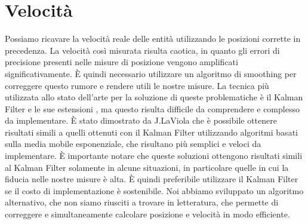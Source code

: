 \section{Velocità}
\label{sec:funzionalita-velocita}
Possiamo ricavare la velocità reale delle entità utilizzando le posizioni corrette in precedenza.
La velocità così misurata risulta caotica, in quanto gli errori di precisione presenti nelle misure di posizione vengono amplificati significativamente.
È quindi necessario utilizzare un algoritmo di smoothing per correggere questo rumore e rendere utili le nostre misure.
La tecnica più utilizzata allo stato dell'arte per la soluzione di queste problematiche è il Kalman Filter e le sue estensioni \cite{kalman}, ma questo risulta difficile da comprendere e complesso da implementare.
È stato dimostrato da J.LaViola \cite{laviola} che è possibile ottenere risultati simili a quelli ottenuti con il Kalman Filter utilizzando algoritmi basati sulla media mobile esponenziale, che risultano più semplici e veloci da implementare.
È importante notare che queste soluzioni ottengono risultati simili al Kalman Filter solamente in alcune situazioni, in particolare quelle in cui la fiducia nelle nostre misure è alta.
È quindi preferibile utilizzare il Kalman Filter se il costo di implementazione è sostenibile.
Noi abbiamo sviluppato un algoritmo alternativo, che non siamo riusciti a trovare in letteratura, che permette di correggere e simultaneamente calcolare posizione e velocità in modo efficiente.
